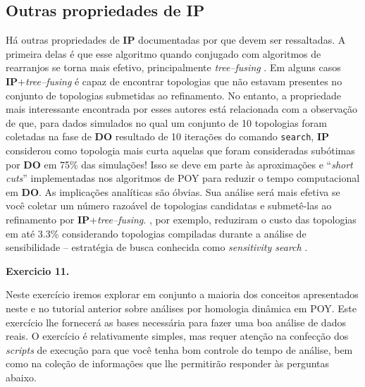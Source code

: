 \begin{refsection}
\subsection{Outras propriedades de \textbf{IP}}\label{tut11:ip:other}

Há outras propriedades de \textbf{IP} documentadas por \textcite{Machado_and_Marques_2013} que devem ser ressaltadas. A primeira delas é que esse algoritmo quando conjugado com algoritmos de rearranjos se torna mais efetivo, principalmente \textit{tree--fusing} \parencite[][]{Goloboff_1999}. Em alguns casos \textbf{IP}+\textit{tree--fusing} é capaz de encontrar topologias que não estavam presentes no conjunto de topologias submetidas ao refinamento. No entanto, a propriedade mais interessante encontrada por esses autores está relacionada com a observação de que, para dados simulados no qual um conjunto de 10 topologias foram coletadas na fase de \textbf{DO} resultado de 10 iterações do comando \texttt{search}, \textbf{IP} considerou como topologia mais curta aquelas que foram consideradas subótimas por \textbf{DO} em 75\% das simulações! Isso se deve em parte às aproximações e ``\textit{short cuts}'' implementadas nos algoritmos de POY para reduzir o tempo computacional em \textbf{DO}. As implicações analíticas são óbvias. Sua análise será mais efetiva se você coletar um número razoável de topologias candidatas e submetê-las ao refinamento por \textbf{IP}+\textit{tree--fusing}. \textcite{Pinto-da-Rocha_et_al_2014}, por exemplo, reduziram o custo das topologias em até 3.3\% considerando topologias compiladas durante a análise de sensibilidade -- estratégia de busca conhecida como \textit{sensitivity search} \parencite[veja][]{Wheeler_et_al_2006}.\\


\begin{blackBlock}{\textbf{Exercicio 11.}}\label{tut11:ex:11.3}

Neste exercício iremos explorar em conjunto a maioria dos conceitos apresentados neste e no tutorial anterior sobre análises por homologia dinâmica em POY. Este exercício lhe fornecerá as bases necessária para fazer uma boa análise de dados reais. O exercício é relativamente simples, mas requer atenção na confecção dos \textit{scripts} de execução para que você tenha bom controle do tempo de análise, bem como na coleção de informações que lhe permitirão responder às perguntas abaixo.

\end{blackBlock}


\end{refsection}
